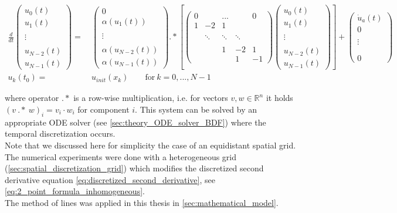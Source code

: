 \documentclass{scrartcl}[12pt, halfparskip]
\numberwithin{equation}{section}
\numberwithin{figure}{section}
\numberwithin{table}{section}
\begin{document}
\begin{align}
	\frac{d}{dt}
	\begin{pmatrix}
		u_0(t) \\
		u_1(t) \\
		\\
		\vdots \\
		\\
		u_{N-2}(t) \\
		u_{N-1}(t)
	\end{pmatrix}
	= & \
	\begin{pmatrix}
	0 \\
	\alpha(u_1(t)) \\
	\\
	\vdots
	\\
	\\
	\alpha(u_{N-2}(t)) \\
	\alpha(u_{N-1}(t))
	\end{pmatrix}
	.* \left[
	\begin{pmatrix}
		0 & & ... & & 0 \\
		1 & -2 & 1 \\
		\\
		& \ddots & \ddots & \ddots \\
		\\
		& & 1 & -2 & 1 \\
		& & & 1 & -1
	\end{pmatrix}
	\begin{pmatrix}
	u_0(t) \\
	u_1(t) \\
	\\
	\vdots \\
	\\
	u_{N-2}(t) \\
	u_{N-1}(t)
	\end{pmatrix} \right]
	+
	\begin{pmatrix}
		\dot{u}_a(t) \\
		0 \\
		\\
		\vdots \\
		\\
		\\
		0
	\end{pmatrix} \\
	u_k(t_0) = & \ u_{init}(x_k) \qquad \text{for} \ k = 0,...,N-1 \nonumber
\end{align}
 
where operator $.*$ is a row-wise multiplication, i.e. for vectors $v, w \in \mathbb{R}^n$ it holds $(v \ .* \ w)_i = v_i \cdot w_i$ for component $i$. This system can be solved by an appropriate ODE solver (see \cref{sec:theory_ODE_solver_BDF}) where the temporal discretization occurs. \\
Note that we discussed here for simplicity the case of an equidistant spatial grid. The numerical experiments were done with a heterogeneous grid (\cref{sec:spatial_discretization_grid}) which modifies the discretized second derivative equation \eqref{eq:discretized_second_derivative}, see \cref{eq:2_point_formula_inhomogeneous}. \\
The method of lines was applied in this thesis in \cref{sec:mathematical_model}.
\end{document}
